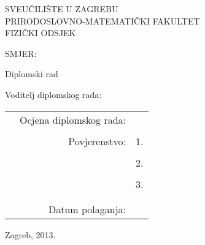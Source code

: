 \thispagestyle{empty}
\pagestyle{empty} 
\begin{center}
\linespread{1}
{\Large SVEUČILIŠTE U ZAGREBU}\\
{\Large PRIRODOSLOVNO-MATEMATIČKI FAKULTET}\\
{\Large FIZIČKI ODSJEK} 

\vspace{0.8cm}

{\Large SMJER: \SMJER} 

\vspace{1.3cm}

{\LARGE \textbf{\ImeIPrezime}} 

\vspace{1cm}

{\large Diplomski rad\par} 

\vfill

{\Large \NASLOV\par}

\vfill

{\large Voditelj diplomskog rada: \VODITELJ}

\vspace{1.3cm}

{\large
\begin{tabular}{crr}
\hspace{0cm} & Ocjena diplomskog rada: \hspace{5mm} &  \underline{\hspace{5cm}} \\ 
 &  &  \\ 
 & Povjerenstvo: \hspace{5mm} & 1. \underline{\hspace{5cm}} \\ 
 &  &  \\  
 &  & 2. \underline{\hspace{5cm}} \\ 
 &  &  \\  
 &  & 3. \underline{\hspace{5cm}} \\ 
 &  &  \\  
 &  &  \\  
 & Datum polaganja: \hspace{5mm} & \underline{\hspace{5cm}} \\ 
 
\end{tabular} 
} %

\vspace{1.5cm}

{\large Zagreb, 2013.}

\end{center}
